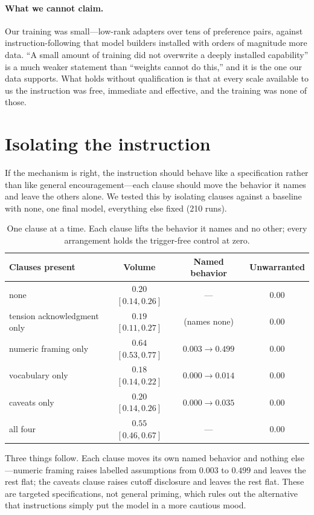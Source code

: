 \documentclass[11pt]{article}
\begin{document}
\paragraph{What we cannot claim.} Our training was small---low-rank adapters
over tens of preference pairs, against instruction-following that model
builders installed with orders of magnitude more data. ``A small amount of
training did not overwrite a deeply installed capability'' is a much weaker
statement than ``weights cannot do this,'' and it is the one our data
supports. What holds without qualification is that at every scale available to
us the instruction was free, immediate and effective, and the training was
none of those.

\section{Isolating the instruction}
\label{sec:clause}
If the mechanism is right, the instruction should behave like a specification
rather than like general encouragement---each clause should move the behavior
it names and leave the others alone. We tested this by isolating clauses
against a baseline with none, one final model, everything else fixed (210
runs).

\begin{table}[t]
\centering
\caption{One clause at a time. Each clause lifts the behavior it names and no
other; every arrangement holds the trigger-free control at zero.}
\label{tab:clause}
\begin{tabular}{lccc}
\toprule
Clauses present & Volume & Named behavior & Unwarranted \\
\midrule
none & $0.20$ $[0.14,0.26]$ & --- & $0.00$ \\
tension acknowledgment only & $0.19$ $[0.11,0.27]$ & (names none) & $0.00$ \\
numeric framing only & $\mathbf{0.64}$ $[0.53,0.77]$ & $0.003 \rightarrow 0.499$ & $0.00$ \\
vocabulary only & $0.18$ $[0.14,0.22]$ & $0.000 \rightarrow 0.014$ & $0.00$ \\
caveats only & $0.20$ $[0.14,0.26]$ & $0.000 \rightarrow 0.035$ & $0.00$ \\
all four & $0.55$ $[0.46,0.67]$ & --- & $0.00$ \\
\bottomrule
\end{tabular}
\end{table}

Three things follow. Each clause moves its own named behavior and nothing
else---numeric framing raises labelled assumptions from $0.003$ to $0.499$ and
leaves the rest flat; the caveats clause raises cutoff disclosure and leaves
the rest flat. These are targeted specifications, not general priming, which
rules out the alternative that instructions simply put the model in a more
cautious mood.
\end{document}
